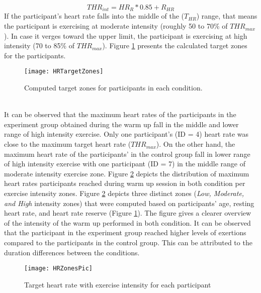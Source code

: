 \begin{equation}
THR_{int} =  HR_{R}*0.85 + R_{HR} 
\end{equation} If the participant's heart rate falls into the middle of the (\begin{math} T_{HR}\end{math}) range, that means the participant is exercising at moderate intensity (roughly 50 to 70\% of \begin{math} THR_{max}\end{math}). In case it verges toward the upper limit, the participant is exercising at high intensity (70 to 85\% of \begin{math} THR_{max}\end{math}). Figure \ref{fig:hrZones} presents the calculated target zones for the participants.\\
\begin{figure}[h]
    \centering
    \texttt{[image: HRTargetZones]}
    \caption{Computed target zones for participants in each condition.}
    \label{fig:hrZones}
\end{figure}\\
It can be observed that the maximum heart rates of the participants in the experiment group obtained during the warm up fall in the middle and lower range of high intensity exercise. Only one participant's (ID = 4) heart rate was close to the maximum target heart rate (\begin{math} THR_{max}\end{math}). On the other hand, the maximum heart rate of the participants' in the control group fall in lower range of high intensity exercise with one participant (ID = 7) in the middle range of moderate intensity exercise zone. Figure \ref{fig:hrzones} depicts the distribution of maximum heart rates participants reached during warm up session in both condition per exercise intensity zones. Figure \ref{fig:hrzones} depicts three distinct zones (\textit{Low, Moderate, and High} intensity zones) that were computed based on participants' age, resting heart rate, and heart rate reserve (Figure \ref{fig:hrZones}). The figure gives a clearer overview of the intensity of the warm up performed in both condition. It can be observed that the participant in the experiment group reached higher levels of exertions compared to the participants in the control group. This can be attributed to the duration differences between the conditions.\pagebreak
\begin{figure}[h]
    \centering
    \texttt{[image: HRZonesPic]}
    \caption{Target heart rate with exercise intensity for each participant}
    \label{fig:hrzones}
\end{figure}\\
